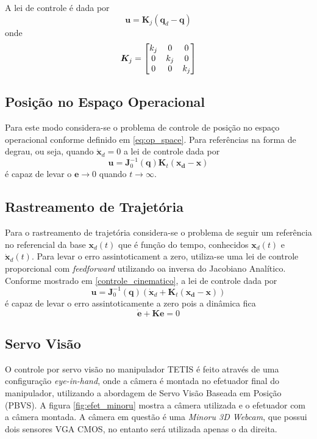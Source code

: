 A lei de controle é dada por 
\begin{equation}
\bm{u} = \bm{K}_j (\bm{q}_d - \bm{q})
\end{equation}
onde 
\[ \bm{K}_j = \begin{bmatrix}
	k_j & 0 & 0 \\ 
	0 & k_j & 0 \\ 
	0 &  0  & k_j
\end{bmatrix}
\]

\subsection{Posição no Espaço Operacional}
Para este modo considera-se o problema de controle de posição no espaço operacional conforme definido em \ref{eq:op_space}. Para referências na forma de degrau, ou seja, quando $\dot{\bm{x}}_d = 0$ a lei de controle dada por
\begin{equation} \label{eq:lei_posicao}
\bm{u} = \bm{J}_0^{-1}(\bm{q})  \bm{K}_t (\bm{x_d} - \bm{x})
\end{equation}
é capaz de levar o $\bm{e} \rightarrow 0$ quando $t \rightarrow \infty$.

\subsection{Rastreamento de Trajetória}
Para o rastreamento de trajetória considera-se o problema de seguir um referência no referencial da base $\bm{x}_d(t)$ que é função do tempo, conhecidos $\bm{x}_d(t)$ e $\bm{\dot{x}}_d(t)$. Para levar o erro assintoticament a zero, utiliza-se uma lei de controle proporcional com \textit{feedforward} utilizando oa inversa do Jacobiano Analítico. Conforme mostrado em \ref{controle_cinematico}, a lei de controle dada por 
\begin{equation}
\bm{u} = \bm{J}_0^{-1}(\bm{q}) (\dot{\bm{x}}_d + \bm{K}_t (\bm{x_d} - \bm{x}))
\end{equation} 
é capaz de levar o erro assintoticamente a zero pois a dinâmica fica 
\begin{equation}
\dot{\bm{e}} + \bm{K} \bm{e} = 0
\end{equation}


\subsection{Servo Visão}
O controle por servo visão no manipulador TETIS é feito através de uma configuração \textit{eye-in-hand}, onde a câmera é montada no efetuador final do manipulador, utilizando a abordagem de Servo Visão Baseada em Posição (PBVS). A figura \ref{fig:efet_minoru} mostra a câmera utilizada e o efetuador com a câmera montada.
A câmera em questão é uma \textit{Minoru 3D Webcam}, que possui dois sensores VGA CMOS, no entanto será utilizada apenas o da direita.

